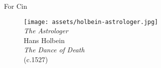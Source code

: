 
\noindent For Cin

\begin{figure}
    \vspace{50pt}
    \centering
    \texttt{[image: assets/holbein-astrologer.jpg]}
    \\
    \emph{The Astrologer}
    \\
    Hans Holbein
    \\
    \emph{The Dance of Death}
    \\
    (c.1527)
\end{figure}
